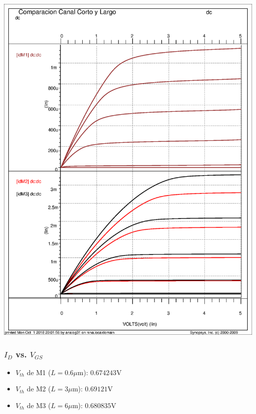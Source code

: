 \includegraphics[scale=0.7]{images/parametric}
\subsubsection{$I_D$ vs. $V_{GS}$} 
\begin{itemize}
	\item $V_{th}$ de M1 ($L=0.6\mu$m): $0.674243$V
	\item $V_{th}$ de M2 ($L=3\mu$m): $0.69121$V
	\item $V_{th}$ de M3 ($L=6\mu$m): $0.680835$V
\end{itemize}


